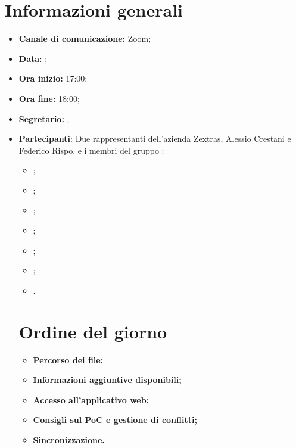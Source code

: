 \section{Informazioni generali}

\begin{itemize}

    \item \textbf{Canale di comunicazione:} Zoom;

    \item \textbf{Data:} \DataMeeting{};
    
    \item \textbf{Ora inizio:} 17:00;

    \item \textbf{Ora fine:} 18:00;

    \item \textbf{Segretario:} \Davide{};

    \item \textbf{Partecipanti}: Due rappresentanti dell'azienda Zextras, Alessio Crestani e Federico Rispo,  e i membri del gruppo \Gruppo{}:
    
        \begin{itemize}
            \item \Daniele{};
            \item \Davide{};
            \item \Francesco{};
            \item \Giosue{};
            \item \Lucrezia{};
            \item \Matteo{};
             \item \Tommaso{}.
        \end{itemize}

\section{Ordine del giorno}

\begin{itemize}
    \item\textbf{Percorso dei file;}
    \item\textbf{Informazioni aggiuntive disponibili;}
    \item\textbf{Accesso all'applicativo web;}
     \item\textbf{Consigli sul PoC e gestione di conflitti;}
      \item\textbf{Sincronizzazione.}
\end{itemize}
\end{itemize}
\newpage


